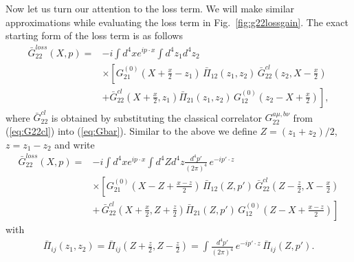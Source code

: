 \documentclass[onecolumn,showpacs,nobibnotes,nofootinbib,12pt,aps,prd,showpacs,notitlepage,nofootinbib,preprintnumbers,amsmath,amssymb]{article}
\def\fig#1{{Fig.~\ref{#1}}}
\begin{document}
Now let us turn our attention to the loss term. We will make similar
approximations while evaluating the loss term in
\fig{fig:g22lossgain}. The exact starting form of the loss term is as
follows
\begin{align}
  \bar G^{loss}_{22}(X,p)= & - i\int d^4x e^{ip\cdot x} \int d^4 z_1  d^4 z_2\nonumber\\
  & \times\left[ G^{(0)}_{21}\left(X+\frac{x}{2}-z_1\right) \, \bar\Pi_{12}(z_1,z_2) \, \bar G^{cl}_{22}\left(z_2,X-\frac{x}{2}\right) \right. \nonumber \\
  &\left.+ \bar G^{cl}_{22}\left(X+\frac{x}{2},z_1\right)
    \bar\Pi_{21}(z_1,z_2) \, G^{(0)}_{12}\left(z_2 - X +
      \frac{x}{2}\right)\right],\label{eq:G22loss}
\end{align}
where $\bar G^{cl}_{22}$ is obtained by substituting the classical
correlator $G_{22}^{a\mu,b\nu}$ from (\ref{eq:G22cl}) into
(\ref{eq:Gbar}). Similar to the above we define $Z = (z_1 + z_2)/2$,
$z = z_1 - z_2$ and write
\begin{align}
  \bar G^{loss}_{22}(X,p)= & - i\int d^4x e^{ip\cdot x} \int d^4 Z d^4
  z \frac{d^4 p'}{(2 \pi)^4} \, e^{-i p'
    \cdot z} \, \nonumber\\
  & \times\left[ G^{(0)}_{21}\left(X-Z+\frac{x-z}{2} \right) \,
    \bar\Pi_{12}(Z, p') \, \bar G^{cl}_{22}\left(Z - \frac{z}{2} , X
      -\frac{x}{2}\right) \right. \nonumber \\ &\left. + \, \bar
    G^{cl}_{22}\left(X+\frac{x}{2} , Z + \frac{z}{2} \right)
    \bar\Pi_{21}(Z, p') \, G^{(0)}_{12}\left(Z-X
      +\frac{x-z}{2}\right)\right] \label{eq:G22loss1}
\end{align}
with
\begin{align}
  \label{eq:Pi_tr}
  \bar\Pi_{ij}(z_1,z_2) = \bar\Pi_{ij} \left(Z + \frac{z}{2} , Z -
    \frac{z}{2} \right) = \int \frac{d^4 p'}{(2 \pi)^4} \, e^{-i p'
    \cdot z} \, \bar\Pi_{ij} (Z, p').
\end{align}
\end{document}
